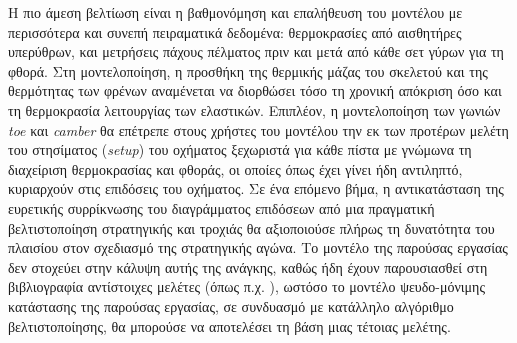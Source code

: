 Η πιο άμεση βελτίωση είναι η βαθμονόμηση και επαλήθευση του μοντέλου με περισσότερα και συνεπή πειραματικά
δεδομένα: θερμοκρασίες από αισθητήρες υπερύθρων, και μετρήσεις πάχους πέλματος πριν και μετά από κάθε
σετ γύρων για τη φθορά. Στη μοντελοποίηση, η προσθήκη της θερμικής μάζας του σκελετού και της
θερμότητας των φρένων αναμένεται να διορθώσει τόσο τη χρονική απόκριση όσο και τη θερμοκρασία λειτουργίας
των ελαστικών. Επιπλέον, η μοντελοποίηση των γωνιών \textit{toe} και \textit{camber} θα επέτρεπε στους χρήστες του μοντέλου την εκ των προτέρων μελέτη του στησίματος (\textit{setup}) του οχήματος ξεχωριστά για κάθε πίστα με γνώμωνα τη διαχείριση θερμοκρασίας και φθοράς, οι οποίες όπως έχει γίνει ήδη αντιληπτό, κυριαρχούν στις επιδόσεις του οχήματος.
Σε ένα επόμενο βήμα, η αντικατάσταση της ευρετικής συρρίκνωσης του διαγράμματος
επιδόσεων από μια πραγματική βελτιστοποίηση στρατηγικής και τροχιάς θα αξιοποιούσε πλήρως τη δυνατότητα του πλαισίου
στον σχεδιασμό της στρατηγικής αγώνα. Το μοντέλο της παρούσας εργασίας δεν στοχεύει στην κάλυψη αυτής της ανάγκης, καθώς ήδη έχουν παρουσιασθεί στη βιβλιογραφία αντίστοιχες μελέτες (όπως π.χ. \cite{Tremlett2016}), ωστόσο το μοντέλο ψευδο-μόνιμης κατάστασης της παρούσας εργασίας, σε συνδυασμό με κατάλληλο αλγόριθμο βελτιστοποίησης, θα μπορούσε να αποτελέσει τη βάση μιας τέτοιας μελέτης.
